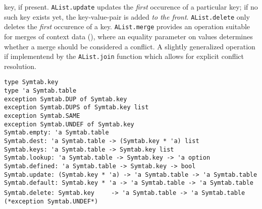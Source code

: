 \begin{isabellebody}
\begin{isamarkuptext}
  key, if present.  \verb|AList.update| updates
  the \emph{first} occurence of a particular key; if no such
  key exists yet, the key-value-pair is added \emph{to the front}.
  \verb|AList.delete| only deletes the \emph{first} occurence of a key.
  \verb|AList.merge| provides an operation suitable for merges of context data
  (), where an equality parameter on
  values determines whether a merge should be considered a conflict.
  A slightly generalized operation if implementend by the \verb|AList.join|
  function which allows for explicit conflict resolution.%
\end{isamarkuptext}%
\isamarkuptrue%
%
\isamarkuptrue%
%
\begin{isamarkuptext}%
\begin{mldecls}
  \verb|type Symtab.key| \\
  \verb|type 'a Symtab.table| \\
  \verb|exception Symtab.DUP of Symtab.key| \\
  \verb|exception Symtab.DUPS of Symtab.key list| \\
  \verb|exception Symtab.SAME| \\
  \verb|exception Symtab.UNDEF of Symtab.key| \\
  \verb|Symtab.empty: 'a Symtab.table| \\
  \verb|Symtab.dest: 'a Symtab.table -> (Symtab.key * 'a) list| \\
  \verb|Symtab.keys: 'a Symtab.table -> Symtab.key list| \\
  \verb|Symtab.lookup: 'a Symtab.table -> Symtab.key -> 'a option| \\
  \verb|Symtab.defined: 'a Symtab.table -> Symtab.key -> bool| \\
  \verb|Symtab.update: (Symtab.key * 'a) -> 'a Symtab.table -> 'a Symtab.table| \\
  \verb|Symtab.default: Symtab.key * 'a -> 'a Symtab.table -> 'a Symtab.table| \\
  \verb|Symtab.delete: Symtab.key|\isasep\isanewline%
\verb|    -> 'a Symtab.table -> 'a Symtab.table (*exception Symtab.UNDEF*)| \\

\end{mldecls}
\end{isamarkuptext}
\end{isabellebody}
